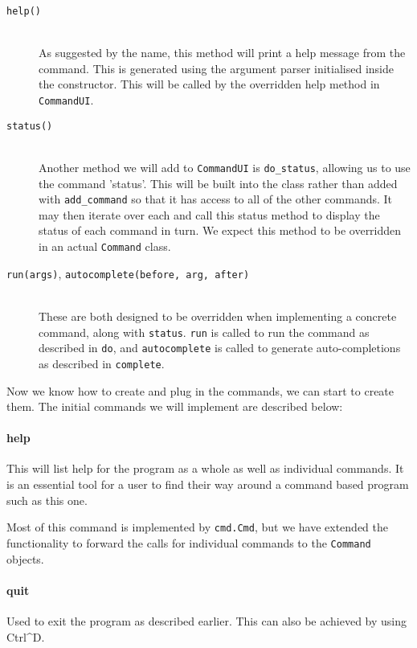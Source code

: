 \documentclass[twoside,a4paper]{report}
\begin{document}
\begin{description}
\item[\texttt{help()}] \hfill \\
As suggested by the name, this method will print a help message from the command. This is generated using the argument parser initialised inside
the constructor. This will be called by the overridden help method in \texttt{CommandUI}.

\item[\texttt{status()}] \hfill \\
Another method we will add to \texttt{CommandUI} is \texttt{do\_status}, allowing us to use the command 'status'. This will be built into the
class rather than added with \texttt{add\_command} so that it has access to all of the other commands. It may then iterate over each and call
this status method to display the status of each command in turn. We expect this method to be overridden in an actual \texttt{Command} class.

\item[\texttt{run(args)}, \texttt{autocomplete(before, arg, after)}] \hfill \\
These are both designed to be overridden when implementing a concrete command, along with \texttt{status}. \texttt{run} is called to run the
command as described in \texttt{do}, and \texttt{autocomplete} is called to generate auto-completions as described in \texttt{complete}.
\end{description}

Now we know how to create and plug in the commands, we can start to create them. The initial commands we will implement are described below:

\paragraph{help}

This will list help for the program as a whole as well as individual commands. It is an essential tool for a user to find their way around a
command based program such as this one.

Most of this command is implemented by \texttt{cmd.Cmd}, but we have extended the functionality to forward the calls for individual commands
to the \texttt{Command} objects.

\paragraph{quit}

Used to exit the program as described earlier. This can also be achieved by using Ctrl\^{}D.
\end{document}
